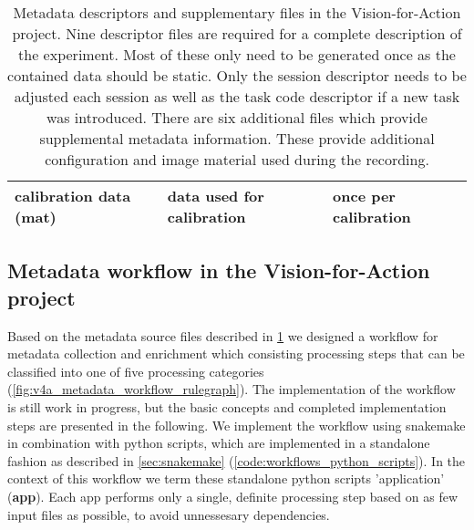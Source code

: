 \begin{table}[]
\begin{tabular}{lll}
\multicolumn{1}{|l|}{calibration data (mat)}       & \multicolumn{1}{l|}{data used for calibration}                                                                         & \multicolumn{1}{l|}{once per calibration}                                            \\ \hline
\end{tabular}
\caption[Metadata files in the Vision-for-Action project]{Metadata descriptors and supplementary files in the Vision-for-Action project. Nine  descriptor files are required for a complete description of the experiment. Most of these only need to be generated once as the contained data should be static. Only the session descriptor needs to be adjusted each session as well as the task code descriptor if a new task was introduced. There are six additional files which provide supplemental metadata information. These provide additional configuration and image material used during the recording.}
\label{tab:v4a_metadata_files}
\end{table}

\subsection{Metadata workflow in the Vision-for-Action project}

Based on the metadata source files described in \cref{tab:v4a_metadata_files} we designed a workflow for metadata collection and enrichment which consisting processing steps that can be classified into one of five processing categories (\cref{fig:v4a_metadata_workflow_rulegraph}). The implementation of the workflow is still work in progress, but the basic concepts and completed implementation steps are presented in the following. We implement the workflow using snakemake in combination with python scripts, which are implemented in a standalone fashion as described in \cref{sec:snakemake} (\cref{code:workflows_python_scripts}). In the context of this workflow we term these standalone python scripts 'application' (\textbf{app}). Each app performs only a single, definite processing step based on as few input files as possible, to avoid unnessesary dependencies.

